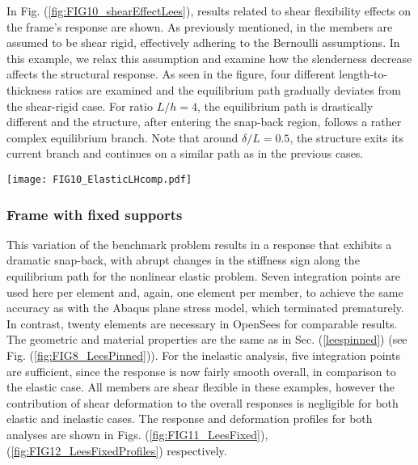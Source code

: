 \begin{figure*}[b]
	\centering
	\qquad
	\caption{Deformation profiles for Lee's frame with pinned supports.}%
	\label{fig:FIG9_LeesPinnedProfiles}%
\end{figure*}
\clearpage
In Fig. (\ref{fig:FIG10_shearEffectLees}), results related to shear flexibility
effects on the frame's response are shown.  As previously mentioned, in 
\cite{Lee}
the members are assumed to be shear rigid, effectively adhering to the Bernoulli
assumptions. In this example, we relax this assumption and examine how the
slenderness decrease affects the structural response. As seen in the figure,
four different length-to-thickness ratios are examined and the equilibrium
path gradually deviates from the shear-rigid case. For ratio $L/h=4$, the
equilibrium path is drastically different and the structure, after entering the
snap-back region, follows a rather complex equilibrium branch. Note that around
$\delta/L=0.5$, the structure exits its current branch and continues on a 
similar
path as in the previous cases.

\begin{figure*}[t]
	\centering
	\texttt{[image: FIG10\_ElasticLHcomp.pdf]}
	\caption{Effect of shear flexibility on Lee's frame response. }
	\label{fig:FIG10_shearEffectLees}
\end{figure*}

\subsubsection{Frame with fixed supports}
This variation of the benchmark problem results in a response that exhibits
a dramatic snap-back, with abrupt changes in the stiffness sign along the
equilibrium path for the nonlinear elastic problem.
Seven integration points are used here per element and, again, one element
per member, to achieve the same accuracy as with
the Abaqus plane stress model, which terminated prematurely. 
In contrast, twenty
elements are necessary in OpenSees for comparable results. The geometric
and material properties are the same as in Sec. (\ref{leespinned}) (see Fig.
(\ref{fig:FIG8_LeesPinned})). For the inelastic analysis, five integration
points are sufficient, since the response is now fairly smooth overall,
in comparison to the elastic case. All members
are shear flexible in these examples, however the contribution of shear
deformation to the overall responses is negligible for both elastic and
inelastic cases.
The response and deformation profiles for both analyses are shown in Figs.
(\ref{fig:FIG11_LeesFixed}),(\ref{fig:FIG12_LeesFixedProfiles}) respectively.

